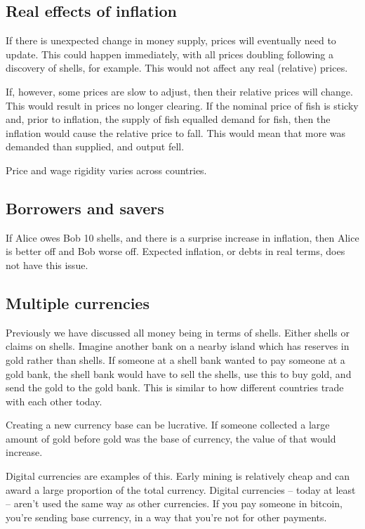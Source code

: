 
\subsection{Real effects of inflation}

If there is unexpected change in money supply, prices will eventually need to update. This could happen immediately, with all prices doubling following a discovery of shells, for example. This would not affect any real (relative) prices.

If, however, some prices are slow to adjust, then their relative prices will change. This would result in prices no longer clearing. If the nominal price of fish is sticky and, prior to inflation, the supply of fish equalled demand for fish, then the inflation would cause the relative price to fall. This would mean that more was demanded than supplied, and output fell.

Price and wage rigidity varies across countries.

\subsection{Borrowers and savers}

If Alice owes Bob 10 shells, and there is a surprise increase in inflation, then Alice is better off and Bob worse off. Expected inflation, or debts in real terms, does not have this issue.

\subsection{Multiple currencies}

Previously we have discussed all money being in terms of shells. Either shells or claims on shells. Imagine another bank on a nearby island which has reserves in gold rather than shells. If someone at a shell bank wanted to pay someone at a gold bank, the shell bank would have to sell the shells, use this to buy gold, and send the gold to the gold bank. This is similar to how different countries trade with each other today.

Creating a new currency base can be lucrative. If someone collected a large amount of gold before gold was the base of currency, the value of that would increase.

Digital currencies are examples of this. Early mining is relatively cheap and can award a large proportion of the total currency. Digital currencies – today at least – aren’t used the same way as other currencies. If you pay someone in bitcoin, you’re sending base currency, in a way that you’re not for other payments.

